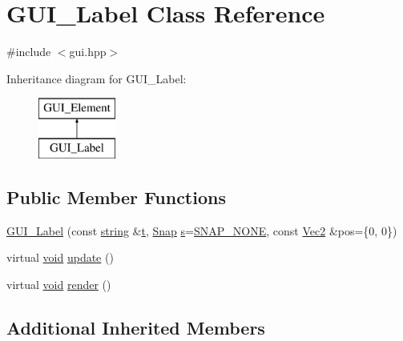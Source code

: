 \hypertarget{class_g_u_i___label}{\section{G\-U\-I\-\_\-\-Label Class Reference}
\label{class_g_u_i___label}
}


{\ttfamily \#include $<$gui.\-hpp$>$}

Inheritance diagram for G\-U\-I\-\_\-\-Label\-:\begin{figure}[H]
\begin{center}
\leavevmode
\includegraphics[height=2.000000cm]{class_g_u_i___label}
\end{center}
\end{figure}
\subsection*{Public Member Functions}
\begin{DoxyCompactItemize}
\item 
\hyperlink{class_g_u_i___label_ae897a315d83658024a79de8d63562945}{G\-U\-I\-\_\-\-Label} (const \hyperlink{_s_d_l__opengl__glext_8h_ae84541b4f3d8e1ea24ec0f466a8c568b}{string} \&\hyperlink{_s_d_l__opengl_8h_a7d65d00ca3b0630d9b5c52df855b19f5}{t}, \hyperlink{gui_8hpp_a783fc9ada177ee80c2fc73bc2e488bc0}{Snap} \hyperlink{_s_d_l__opengl_8h_a4af680a6c683f88ed67b76f207f2e6e4}{s}=\hyperlink{gui_8hpp_a783fc9ada177ee80c2fc73bc2e488bc0ab47624cb228d9afb43c71d3c4e5caf33}{S\-N\-A\-P\-\_\-\-N\-O\-N\-E}, const \hyperlink{class_vec2}{Vec2} \&pos=\{0, 0\})
\item 
virtual \hyperlink{_s_d_l__opengles2__gl2ext_8h_ae5d8fa23ad07c48bb609509eae494c95}{void} \hyperlink{class_g_u_i___label_a139decbab557724d3c3e99eea955b4dd}{update} ()
\item 
virtual \hyperlink{_s_d_l__opengles2__gl2ext_8h_ae5d8fa23ad07c48bb609509eae494c95}{void} \hyperlink{class_g_u_i___label_a8dc90f9d0f2866e74c182473aae94c74}{render} ()
\end{DoxyCompactItemize}
\subsection*{Additional Inherited Members}


